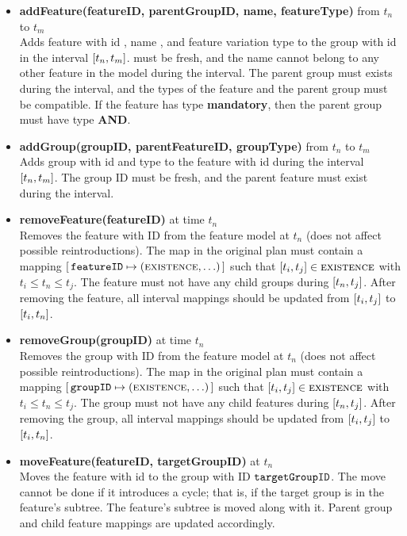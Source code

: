 \begin{itemize}
  \item \textbf{addFeature(featureID, parentGroupID, name, featureType)} from $t_n$ to $t_m$\\
    Adds feature with id , name , and feature variation type  to the group with id  in the interval $\interval{t_n}{t_m}$.  must be fresh, and the name cannot belong to any other feature in the model during the interval. The parent group must exists during the interval, and the types of the feature and the parent group must be compatible. If the feature has type \textbf{mandatory}, then the parent group must have type \textbf{AND}.
  \item \textbf{addGroup(groupID, parentFeatureID, groupType)} from $t_n$ to $t_m$\\
    Adds group with id  and type  to the feature with id  during the interval $\interval{t_n}{t_m}$. The group ID must be fresh, and the parent feature must exist during the interval. 
  \item \textbf{removeFeature(featureID)} at time $t_n$\\
    Removes the feature with ID  from the feature model at $t_n$ (does not affect possible reintroductions). The \features{} map in the original plan must contain a mapping $[ \,\texttt{featureID} \mapsto (\textsc{existence}, \ldots)\, ]$ such that $\interval{t_i}{t_j} \in \map{existence}$ with $ t_i \leq t_n \leq t_j$. The feature must not have any child groups during $\interval{t_n}{t_j}$. After removing the feature, all interval mappings should be updated from $\interval{t_i}{t_j}$ to $\interval{t_i}{t_n}$.
  \item \textbf{removeGroup(groupID)} at time $t_n$\\
    Removes the group with ID  from the feature model at $t_n$ (does not affect possible reintroductions). The \groups{} map in the original plan must contain a mapping $[ \,\texttt{groupID} \mapsto (\textsc{existence}, \ldots)\, ]$ such that $\interval{t_i}{t_j} \in \map{existence}$ with $t_i \leq t_n \leq t_j$. The group must not have any child features during $\interval{t_n}{t_j}$. After removing the group, all interval mappings should be updated from $\interval{t_i}{t_j}$ to $\interval{t_i}{t_n}$. 
  \item \textbf{moveFeature(featureID, targetGroupID)} at $t_n$\\
    Moves the feature with id  to the group with ID $\texttt{targetGroupID}$. The move cannot be done if it introduces a cycle; that is, if the target group is in the feature's subtree. The feature's subtree is moved along with it. Parent group and child feature mappings are updated accordingly. 

\end{itemize}
